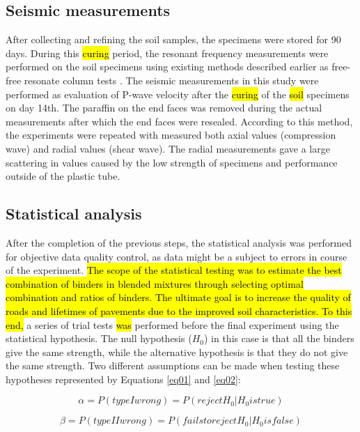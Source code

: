 \documentclass[constrmater,article,submit,pdftex,moreauthors]{Definitions/mdpi}
\begin{document}
\subsection{Seismic measurements}
After collecting and refining the soil samples, the specimens were stored for 90 days. During this \hl{curing} period, the resonant frequency measurements were performed on the soil specimens using existing methods described earlier as free-free resonate column tests \citep{Aldaood,Lindh2021b,Lindh2022c,ThomasRangaswamy,Ryden}. The seismic measurements in this study were performed as evaluation of P-wave velocity after the \hl{curing} of the \hl{soil }specimens on day 14th. The paraffin on the end faces was removed during the actual measurements after which the end faces were resealed. According to this method, the experiments were repeated with measured both axial values (compression wave) and radial values (shear wave). The radial measurements gave a large scattering in values caused by the low strength of specimens and performance outside of the plastic tube.

\subsection{Statistical analysis}
After the completion of the previous steps, the statistical analysis was performed for objective data quality control, as data might be a subject to errors in course of the experiment. \hl{The scope of the statistical testing was to estimate the best combination of binders in blended mixtures through selecting optimal combination and ratios of binders. The ultimate goal is to increase the quality of roads and lifetimes of pavements due to the improved soil characteristics. To this end,} a series of trial tests \hl{was} performed before the final experiment\hl{ }using the statistical hypothesis. The null hypothesis ($H_0$) in this case is that all the binders give the same strength, while the alternative hypothesis is that they do not give the same strength. Two different assumptions can be made when testing these hypotheses represented by Equations \ref{eq01} and \ref{eq02}:

\begin{equation}\label{eq01}
	\alpha = P (type I wrong) = P(reject H_0 | H_0 is true)
\end{equation}

\begin{equation}\label{eq02}
	\beta = P (type II wrong) = P(fails to reject H_0 | H_0 is false)
\end{equation}
\end{document}
